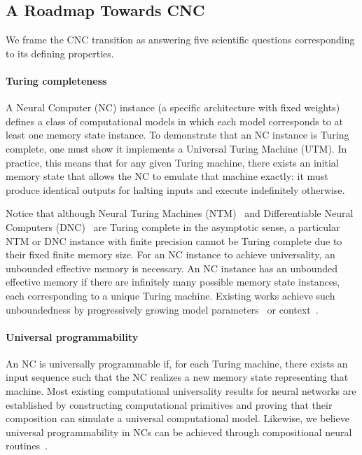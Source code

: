 \subsection{A Roadmap Towards CNC}
\label{sec:roadmap}
We frame the CNC transition as answering five scientific questions corresponding to its defining properties.

\paragraph{Turing completeness}
A Neural Computer (NC) instance (a specific architecture with fixed weights) defines a class of computational models in which each model corresponds to at least one memory state instance.
To demonstrate that an NC instance is Turing complete, one must show it implements a Universal Turing Machine (UTM). In practice, this means that for any given Turing machine, there exists an initial memory state that allows the NC to emulate that machine exactly: it must produce identical outputs for halting inputs and execute indefinitely otherwise. 

Notice that although Neural Turing Machines (NTM)~\citep{graves2014neural} and Differentiable Neural Computers (DNC)~\citep{graves2016hybrid} are Turing complete in the asymptotic sense, a particular NTM or DNC instance with finite precision cannot be Turing complete due to their fixed finite memory size.
For an NC instance to achieve universality, an unbounded effective memory is necessary.
An NC instance has an unbounded effective memory if there are infinitely many possible memory state instances, each corresponding to a unique Turing machine. Existing works achieve such unboundedness by progressively growing model parameters~\citep{rusu2016progressive} or context~\citep{vaswani2017attention}.

\paragraph{Universal programmability}
An NC is universally programmable if, for each Turing machine, there exists an input sequence such that the NC realizes a new memory state representing that machine.
Most existing computational universality results for neural networks are established by constructing computational primitives and proving that their composition can simulate a universal computational model.
Likewise, we believe universal programmability in NCs can be achieved through compositional neural routines~\citep{reed2015neural}.


